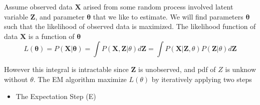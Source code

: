 Assume observed data $\mathbf{X}$ arised from some random process involved latent variable $\mathbf{Z}$, and parameter $\mathbf{\theta}$ that we like to estimate. We will find parameters $\mathbf{\theta}$ such that the likelihood of observed data is maximized. The likelihood function of data $\mathbf{X}$ is a function of $\mathbf{\theta}$
\begin{equation}
	L(\mathbf{\theta}) = P(\mathbf{X}|\mathbf{\theta}) 
		= \int{P(\mathbf{X,Z}|\theta)d\mathbf{Z}} 
		= \int{P(\mathbf{X} | \mathbf{Z}, \theta) P(\mathbf{Z} | \theta) d\mathbf{Z}} 
\end{equation}

However this integral is intractable since $\mathbf{Z}$ is unobserved, and pdf of $Z$ is unknow without $\theta$. The EM algorithm maximize $L(\theta)$ by iteratively applying two steps

\begin{itemize}
	\item The Expectation Step (E)
\end{itemize}
